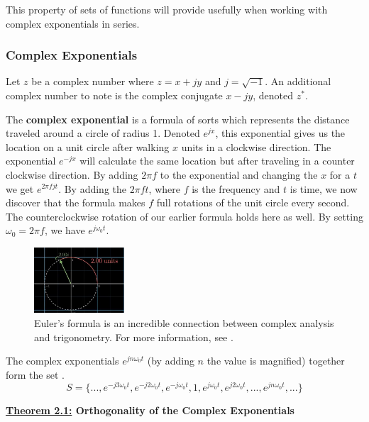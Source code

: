 \documentclass[10pt]{article}
\begin{document}
This property of sets of functions will provide usefully when working with complex exponentials in series.


\subsubsection{Complex Exponentials}
\hspace{\parindent} Let $z$ be a complex number where $z = x + jy$ and $j = \sqrt{-1}$. An additional complex number to note is the complex conjugate $x - jy$, denoted $z^{\ast}$.

The \textbf{complex exponential} is a formula of sorts which represents the distance traveled around a circle of radius 1. Denoted $e^{jx}$, this exponential gives us the location on a unit circle after walking $x$ units in a clockwise direction. The exponential $e^{-jx}$ will calculate the same location but after traveling in a counter clockwise direction. By adding $2\pi f$ to the exponential and changing the $x$ for a $t$ we get $e^{2\pi fjt}$. By adding the $2\pi ft$, where $f$ is the frequency and $t$ is time, we now discover that the formula makes $f$ full rotations of the unit circle every second. The counterclockwise rotation of our earlier formula holds here as well. By setting $\omega_0 = 2\pi f$, we have $e^{j\omega_0t}$.

\begin{figure}[h]
    \centering
    \includegraphics[width=0.3\textwidth]{eulers_circle.jpg}
    \caption{Euler's formula is an incredible connection between complex analysis and trigonometry. For more information, see \cite{eulersFormula}.} 
    \label{fig:eulers circle 1}
\end{figure}

The complex exponentials $e^{jn\omega_0t}$ (by adding $n$ the value is magnified) together form the set \cite{morrison1994fourier}.
\[ S = \{ ..., e^{-j3\omega_0t}, e^{-j2\omega_0t}, e^{-j\omega_0t}, 1, e^{j\omega_0t}, e^{j2\omega_0t}, ..., e^{jn\omega_0t}, ... \} \]


\vspace{4mm}
\noindent
\textbf{\underline{Theorem 2.1:} Orthogonality of the Complex Exponentials}
\end{document}
